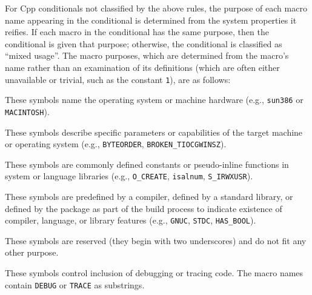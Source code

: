 \documentclass[10pt]{article}
\begin{document}
For Cpp conditionals not classified by the above rules, the purpose of each
macro name appearing in the conditional is determined from the system
properties it reifies.  If each macro in the conditional has the same
purpose, then the conditional is given that purpose; otherwise, the
conditional is classified as ``mixed usage''.  The macro purposes, which
are determined from the macro's name rather than an examination of its
definitions (which are often either unavailable or trivial, such as the
constant {\tt 1}), are as follows:

\begin{description}\itemsep 0pt \parskip 0pt

\item[Portability, machine]
  These symbols name the operating system or machine
  hardware (e.g., \texttt{sun386} or \texttt{MACINTOSH}).
      
\item[Portability, feature] These symbols describe specific parameters
      or capabilities of the target machine or operating system (e.g.,
      \texttt{BYTEORDER}, \verb|BROKEN_TIOCGWINSZ|).  
      

\item[Portability, system]
  These symbols are commonly defined constants or
  pseudo-inline functions in system or language libraries (e.g.,
  \verb|O_CREATE|, \texttt{isalnum}, \verb|S_IRWXUSR|).

\item[Portability, language or library]
  These symbols are predefined by a compiler, defined by a standard
  library, or defined by the package as part of the build
  process to indicate existence of compiler, language, or library features
  (e.g., \texttt{GNUC}, \texttt{STDC}, \verb|HAS_BOOL|).

\item[Miscellaneous system]
  These symbols are reserved (they begin with two underscores) and do
  not fit any other purpose.
      
\item[Debugging]
  These symbols control inclusion of debugging or tracing code.  The macro
  names contain \texttt{DEBUG} or \texttt{TRACE} as substrings.
      

\end{description}
\end{document}

